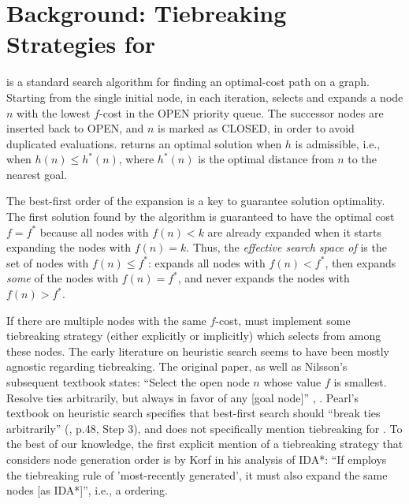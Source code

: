\section{Background: Tiebreaking Strategies for \astar}

\label{sec:astar-background}

\astar is a standard search algorithm for finding an optimal-cost path
on a graph.
Starting from the single initial node, in each iteration, \astar
selects and expands a node $n$ with the lowest $f$-cost in the OPEN
priority queue. The successor nodes are inserted back to OPEN, and $n$
is marked as CLOSED, in order to avoid duplicated evaluations.
\astar returns an optimal solution when $h$ is admissible, i.e., when
$h(n) \leq h^*(n)$, where $h^*(n)$ is the optimal distance from $n$ to
the nearest goal.

The best-first order of the expansion is a key to guarantee solution optimality. 
The first solution found by the algorithm is guaranteed to have the optimal cost $f=f^*$ because 
all nodes with $f(n) < k$ are already expanded when it starts expanding
the nodes with $f(n) = k$.
Thus, the \emph{effective search space of \astar} is the set of nodes with 
$f(n) \leq f^*$: \astar expands all nodes with $f(n) < f^*$, then
expands \emph{some} of the nodes with $f(n) = f^*$, and
never expands the nodes with $f(n) > f^*$.

If there are multiple nodes with the same $f$-cost, \astar
must implement some tiebreaking strategy (either
explicitly or implicitly) which selects from among these nodes.
The early literature on heuristic search seems to have been mostly agnostic regarding tiebreaking.
The original \astar paper, as well as Nilsson's subsequent textbook 
states: ``Select the open node $n$ whose value $f$
is smallest. Resolve ties arbitrarily, but always in favor of any [goal
node]'' \cite[p.102 Step 2]{hart1968formal}, \cite[p.69]{Nilsson71}.
Pearl's textbook on heuristic search specifies that best-first search should ``break ties arbitrarily'' (\citeyear{pearl1984heuristics}, p.48, Step 3), and does not specifically mention tiebreaking for \astar.
To the best of our knowledge, the first explicit mention of a tiebreaking strategy that considers node generation order is by Korf in his analysis of IDA*: ``If \astar employs the tiebreaking rule of 'most-recently generated', it must also expand the same nodes [as IDA*]'', i.e., a \lifo ordering.

